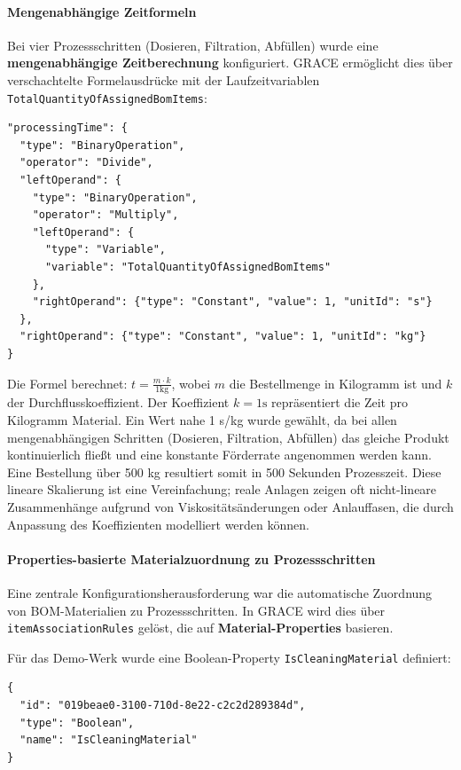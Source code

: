 \paragraph{Mengenabhängige Zeitformeln}

Bei vier Prozessschritten (Dosieren, Filtration, Abfüllen) wurde eine \textbf{mengenabhängige Zeitberechnung} konfiguriert. GRACE ermöglicht dies über verschachtelte Formelausdrücke mit der Laufzeitvariablen \texttt{TotalQuantityOfAssignedBomItems}:

\begin{verbatim}
"processingTime": {
  "type": "BinaryOperation",
  "operator": "Divide",
  "leftOperand": {
    "type": "BinaryOperation",
    "operator": "Multiply",
    "leftOperand": {
      "type": "Variable",
      "variable": "TotalQuantityOfAssignedBomItems"
    },
    "rightOperand": {"type": "Constant", "value": 1, "unitId": "s"}
  },
  "rightOperand": {"type": "Constant", "value": 1, "unitId": "kg"}
}
\end{verbatim}

Die Formel berechnet: $t = \frac{m \cdot k}{1\text{kg}}$, wobei $m$ die Bestellmenge in Kilogramm ist und $k$ der Durchflusskoeffizient. Der Koeffizient $k = 1\text{s}$ repräsentiert die Zeit pro Kilogramm Material. Ein Wert nahe 1 s/kg wurde gewählt, da bei allen mengenabhängigen Schritten (Dosieren, Filtration, Abfüllen) das gleiche Produkt kontinuierlich fließt und eine konstante Förderrate angenommen werden kann. Eine Bestellung über 500 kg resultiert somit in 500 Sekunden Prozesszeit. Diese lineare Skalierung ist eine Vereinfachung; reale Anlagen zeigen oft nicht-lineare Zusammenhänge aufgrund von Viskositätsänderungen oder Anlauffasen, die durch Anpassung des Koeffizienten modelliert werden können.


\paragraph{Properties-basierte Materialzuordnung zu Prozessschritten}

Eine zentrale Konfigurationsherausforderung war die automatische Zuordnung von BOM-Materialien zu Prozessschritten. In GRACE wird dies über \texttt{itemAssociationRules} gelöst, die auf \textbf{Material-Properties} basieren.

Für das Demo-Werk wurde eine Boolean-Property \texttt{IsCleaningMaterial} definiert:

\begin{verbatim}
{
  "id": "019beae0-3100-710d-8e22-c2c2d289384d",
  "type": "Boolean",
  "name": "IsCleaningMaterial"
}
\end{verbatim}


